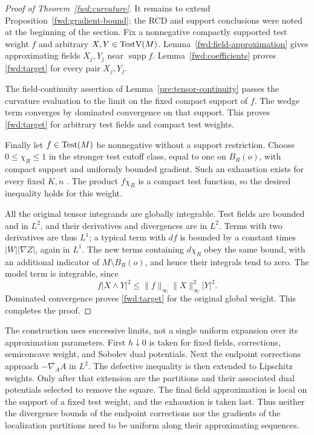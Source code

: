 \begin{proof}[Proof of Theorem~\ref{fwd:curvature}]
It remains to extend Proposition~\ref{fwd:gradient-bound}; the RCD
and support conclusions were noted at the beginning of the section.
Fix a nonnegative compactly supported test weight \(f\) and
arbitrary \(X,Y\in\operatorname{TestV}(M)\). Lemma~\ref{fwd:field-approximation}
gives approximating fields \(X_j,Y_j\) near
\(\operatorname{supp}f\). Lemma~\ref{fwd:coefficients} proves
\eqref{fwd:target} for every pair \(X_j,Y_j\).

The field-continuity assertion of Lemma~\ref{pre:tensor-continuity}
passes the curvature evaluation to the limit on the fixed compact
support of \(f\). The wedge term converges by dominated convergence
on that support. This proves
\eqref{fwd:target} for arbitrary test fields and compact test weights.

Finally let \(f\in\operatorname{Test}(M)\) be nonnegative without a support
restriction. Choose \(0\leq\chi_R\leq1\) in the stronger test
cutoff class, equal to one on \(B_R(o)\), with compact support and
uniformly bounded gradient. Such an exhaustion exists for every
fixed \(K,n\) \cite[Appendix A, Lemma A.2]{GigliTamanini2021}.
The product \(f\chi_R\) is a compact test function, so the desired
inequality holds for this weight.

All the original tensor integrands are globally integrable. Test
fields are bounded and in \(L^2\), and their derivatives and
divergences are in \(L^2\). Terms with two derivatives are thus
\(L^1\); a typical term with \(df\) is bounded by a constant times
\(|W||\nabla Z|\), again in \(L^1\). The new terms containing
\(d\chi_R\) obey the same bound, with an additional indicator of
\(M\setminus B_R(o)\), and hence their integrals tend to zero.
The model term is integrable, since
\[
 f|X\wedge Y|^2
 \leq\|f\|_\infty\|X\|_\infty^2|Y|^2.
\]
Dominated convergence proves \eqref{fwd:target} for the original
global weight. This completes the proof.
\end{proof}

\begin{remark}
\label{fwd:limit-order}
The construction uses successive limits, not a single uniform
expansion over its approximation parameters. First \(h\downarrow0\)
is taken for fixed fields, corrections, semiconcave weight, and
Sobolev dual potentials. Next the endpoint corrections approach
\(-\nabla_AA\) in \(L^2\). The defective inequality is then extended
to Lipschitz weights. Only after that extension are the partitions
and their associated dual potentials selected to remove the square.
The final field approximation is local on the support of a fixed
test weight, and the exhaustion is taken last. Thus neither the
divergence bounds of the endpoint corrections nor the gradients of
the localization partitions need to be uniform along their
approximating sequences.
\end{remark}
